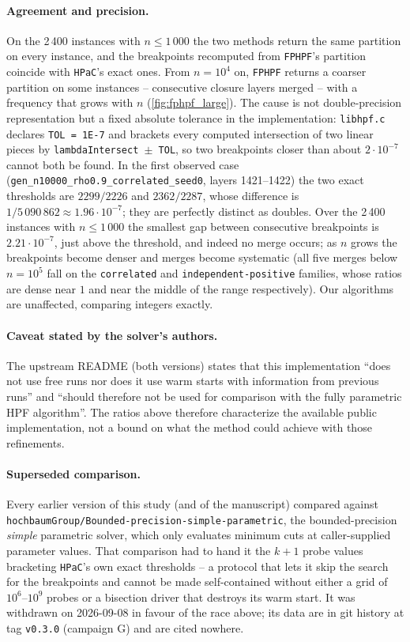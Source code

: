 \documentclass[11pt]{article}
\begin{document}
\paragraph{Agreement and precision.} On the 2\,400 instances with $n\le1\,000$
the two methods return the same partition on every instance, and the
breakpoints recomputed from \texttt{FPHPF}'s partition coincide with
\texttt{HPaC}'s exact ones. From $n=10^4$ on, \texttt{FPHPF} returns a coarser
partition on some instances -- consecutive closure layers merged -- with a
frequency that grows with $n$ (\cref{fig:fphpf_large}). The cause is not
double-precision representation but a fixed absolute tolerance in the
implementation: \texttt{libhpf.c} declares \texttt{TOL = 1E-7} and brackets
every computed intersection of two linear pieces by \texttt{lambdaIntersect
$\pm$ TOL}, so two breakpoints closer than about $2\cdot10^{-7}$ cannot both be
found. In the first observed case (\texttt{gen\_n10000\_rho0.9\_correlated\_seed0},
layers 1421--1422) the two exact thresholds are $2299/2226$ and $2362/2287$,
whose difference is $1/5\,090\,862\approx1.96\cdot10^{-7}$; they are perfectly
distinct as doubles. Over the 2\,400 instances with $n\le1\,000$ the smallest
gap between consecutive breakpoints is $2.21\cdot10^{-7}$, just above the
threshold, and indeed no merge occurs; as $n$ grows the breakpoints become
denser and merges become systematic (all five merges below $n=10^5$ fall on the
\texttt{correlated} and \texttt{independent-positive} families, whose ratios are
dense near $1$ and near the middle of the range respectively). Our algorithms
are unaffected, comparing integers exactly.

\paragraph{Caveat stated by the solver's authors.} The upstream README (both
versions) states that this implementation ``does not use free runs nor does it
use warm starts with information from previous runs'' and ``should therefore
not be used for comparison with the fully parametric HPF algorithm''. The
ratios above therefore characterize the available public implementation, not a
bound on what the method could achieve with those refinements.

\paragraph{Superseded comparison.} Every earlier version of this study (and of
the manuscript) compared against \texttt{hochbaumGroup/Bounded-precision-simple-parametric},
the bounded-precision \emph{simple} parametric solver, which only evaluates
minimum cuts at caller-supplied parameter values. That comparison had to hand
it the $k+1$ probe values bracketing \texttt{HPaC}'s own exact thresholds -- a
protocol that lets it skip the search for the breakpoints and cannot be made
self-contained without either a grid of $10^6$--$10^9$ probes or a bisection
driver that destroys its warm start. It was withdrawn on 2026-09-08 in favour
of the race above; its data are in git history at tag \texttt{v0.3.0}
(campaign G) and are cited nowhere.
\end{document}
